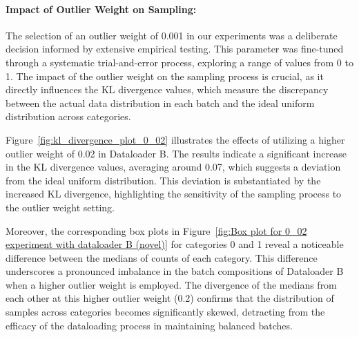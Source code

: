 \paragraph{Impact of Outlier Weight on Sampling:}
The selection of an outlier weight of 0.001 in our experiments was a deliberate decision informed by extensive empirical testing. This parameter was fine-tuned through a systematic trial-and-error process, exploring a range of values from 0 to 1. The impact of the outlier weight on the sampling process is crucial, as it directly influences the KL divergence values, which measure the discrepancy between the actual data distribution in each batch and the ideal uniform distribution across categories.

Figure~\ref{fig:kl_divergence_plot_0_02} illustrates the effects of utilizing a higher outlier weight of 0.02 in Dataloader B. The results indicate a significant increase in the KL divergence values, averaging around 0.07, which suggests a deviation from the ideal uniform distribution. This deviation is substantiated by the increased KL divergence, highlighting the sensitivity of the sampling process to the outlier weight setting.

Moreover, the corresponding box plots in Figure~\ref{fig:Box plot for 0_02 experiment with dataloader B (novel)} for categories 0 and 1 reveal a noticeable difference between the medians of counts of each category. This difference underscores a pronounced imbalance in the batch compositions of Dataloader B when a higher outlier weight is employed. The divergence of the medians from each other at this higher outlier weight (0.2) confirms that the distribution of samples across categories becomes significantly skewed, detracting from the efficacy of the dataloading process in maintaining balanced batches.

